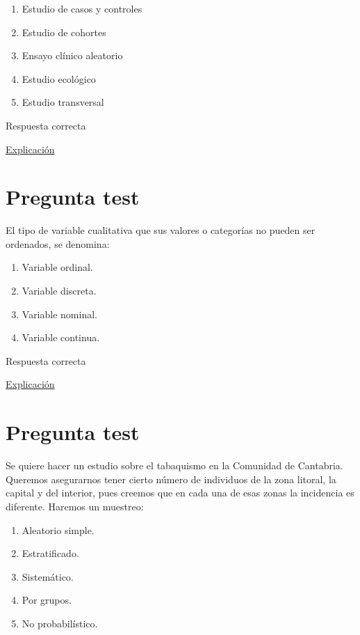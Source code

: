 \documentclass[
]{book}
\providecommand{\tightlist}{%
  \setlength{\itemsep}{0pt}\setlength{\parskip}{0pt}}
\begin{document}
\begin{enumerate}
\def\labelenumi{\alph{enumi})}
\tightlist
\item
  Estudio de casos y controles
\item
  Estudio de cohortes
\item
  Ensayo clínico aleatorio
\item
  Estudio ecológico
\item
  Estudio transversal
\end{enumerate}

Respuesta correcta

\href{http://www.scielo.org.pe/scielo.php?script=sci_arttext\&pid=S2308-05312020000100138}{Explicación}

\hypertarget{pregunta-test-40}{%
\section{Pregunta test}\label{pregunta-test-40}}

El tipo de variable cualitativa que sus valores o categorías no pueden ser ordenados, se denomina:

\begin{enumerate}
\def\labelenumi{\alph{enumi})}
\tightlist
\item
  Variable ordinal.
\item
  Variable discreta.
\item
  Variable nominal.
\item
  Variable continua.
\end{enumerate}

Respuesta correcta

\href{https://1fjmanzano.github.io/bioestadistica/tipos-de-variables.html}{Explicación}

\hypertarget{pregunta-test-41}{%
\section{Pregunta test}\label{pregunta-test-41}}

Se quiere hacer un estudio sobre el tabaquismo en la Comunidad de Cantabria. Queremos asegurarnos tener cierto número de individuos de la zona litoral, la capital y del interior, pues creemos que en cada una de esas zonas la incidencia es diferente. Haremos un muestreo:

\begin{enumerate}
\def\labelenumi{\alph{enumi})}
\tightlist
\item
  Aleatorio simple.
\item
  Estratificado.
\item
  Sistemático.
\item
  Por grupos.
\item
  No probabilístico.
\end{enumerate}
\end{document}
